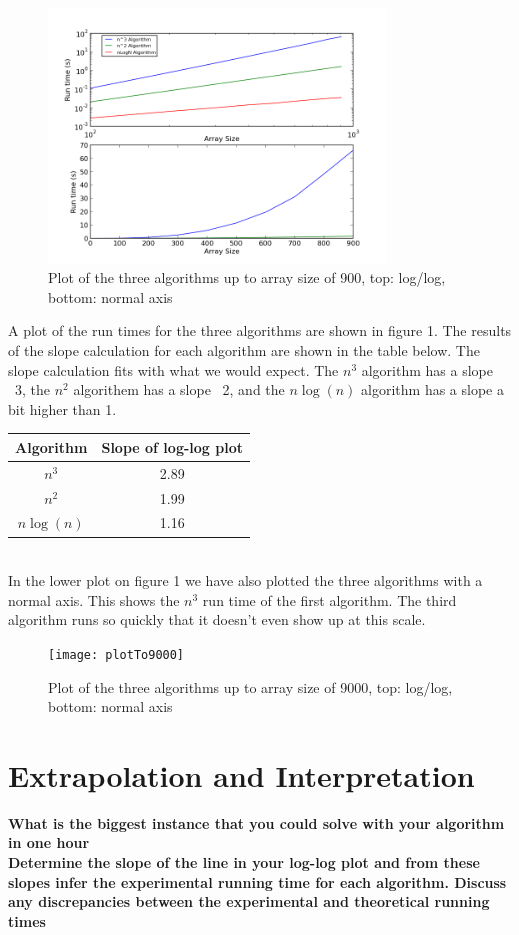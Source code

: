 \documentclass[a4paper,12pt]{article}
\begin{document}
\begin{figure}[h!]
\centering
\includegraphics[width=0.8\textwidth]{plotTo900}
\caption{Plot of the three algorithms up to array size of 900, top: log/log, bottom: normal axis}
\end{figure} 

A plot of the run times for the three algorithms are shown in figure 1.  The results of the slope calculation for each algorithm are shown in the table below.  The slope calculation fits with what we would expect.  The $n^3$ algorithm has a slope ~3, the $n^2$ algorithem has a slope ~2, and the $n\log(n)$ algorithm has a slope a bit higher than 1. \\

\begin{tabular}{|c|c|}
\hline 
Algorithm & Slope of log-log plot \\ 
\hline 
$n^3$ & 2.89 \\ 
\hline 
$n^2$ & 1.99 \\ 
\hline 
$n\log(n)$ & 1.16 \\ 
\hline 
\end{tabular}\\

In the lower plot on figure 1 we have also plotted the three algorithms with a normal axis.  This shows the $n^3$ run time of the first algorithm.  The third algorithm runs so quickly that it doesn't even show up at this scale. 

\begin{figure}[h!]
\centering
\texttt{[image: plotTo9000]}
\caption{Plot of the three algorithms up to array size of 9000, top: log/log, bottom: normal axis}
\end{figure} 



\pagebreak
 

\section*{Extrapolation and Interpretation}

\textbf{What is the biggest instance that you could solve with your algorithm in one hour}\\


\textbf{Determine the slope of the line in your log-log plot and from these slopes infer the experimental running time for each algorithm. Discuss any discrepancies between the experimental and theoretical running times}\\
\end{document}
